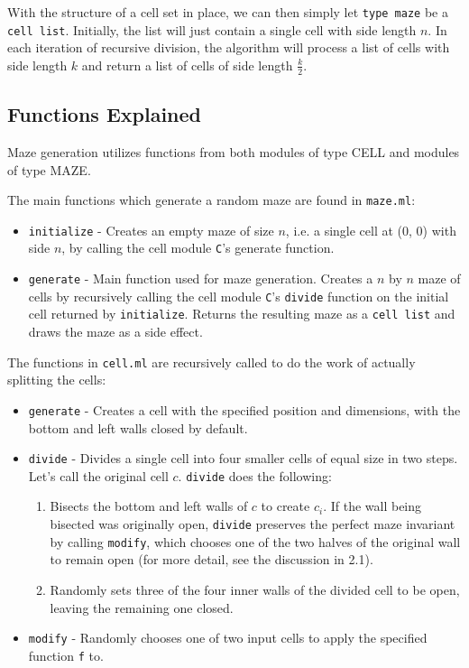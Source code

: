 \documentclass[11pt, margin=1in]{article}
\newcommand{\tab}{\par \qquad}
\begin{document}
\tab With the structure of a cell set in place, we can then simply let \texttt{type maze} be a \texttt{cell list}.  Initially, the list will just contain a single cell with side length $n$.  In each iteration of recursive division, the algorithm will process a list of cells with side length $k$ and return a list of cells of side length $\frac{k}{2}$.                   
   
\subsection{Functions Explained} 
Maze generation utilizes functions from both modules of type \textsc{CELL} and modules of type \textsc{MAZE}.  

The main functions which generate a random maze are found in \texttt{maze.ml}:
\begin{itemize}
\item \texttt{initialize} - Creates an empty maze of size $n$, i.e. a single cell at (0, 0) with side $n$, by calling the cell module \texttt{C}'s generate function.
\item \texttt{generate} - Main function used for maze generation. Creates a $n$ by $n$ maze of cells by recursively calling the cell module \texttt{C}'s \texttt{divide} function on the initial cell returned by \texttt{initialize}. Returns the resulting maze as a \texttt{cell list} and draws the maze as a side effect.
\end{itemize}

The functions in \texttt{cell.ml} are recursively called to do the work of actually splitting the cells:
\begin{itemize}
\item \texttt{generate} - Creates a cell with the specified position and dimensions, with the bottom and left walls closed by default. 
\item \texttt{divide} - Divides a single cell into four smaller cells of equal size in two steps. Let's call the original cell $c$. \texttt{divide} does the following: 
\begin{enumerate}
\item Bisects the bottom and left walls of $c$ to create $c_i$. If the wall being bisected was originally open, \texttt{divide} preserves the perfect maze invariant by calling \texttt{modify}, which chooses one of the two halves of the original wall to remain open (for more detail, see the discussion in 2.1). 

\item Randomly sets three of the four inner walls of the divided cell to be open, leaving the remaining one closed.  
\end{enumerate}
\item \texttt{modify} - Randomly chooses one of two input cells to apply the specified function \texttt{f} to. 
\end{itemize}
\end{document}
